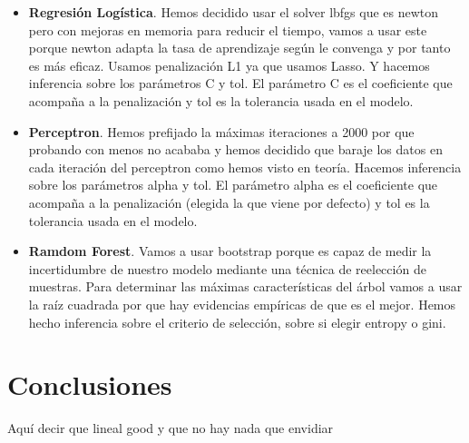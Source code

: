 \documentclass[a4paper,11pt]{article}
\begin{document}
\begin{itemize}

\item \textbf{Regresión Logística}. Hemos decidido usar el solver lbfgs que es newton pero con mejoras en memoria para reducir el tiempo, vamos a usar este porque newton adapta la tasa de aprendizaje según le convenga y por tanto es más eficaz. Usamos penalización L1 ya que usamos Lasso. Y hacemos inferencia sobre los parámetros C y tol. El parámetro C es el coeficiente que acompaña a la penalización y tol es la tolerancia usada en el modelo.

\item \textbf{Perceptron}. Hemos prefijado la máximas iteraciones a 2000 por que probando con menos no acababa y hemos decidido que baraje los datos en cada iteración del perceptron como hemos visto en teoría. Hacemos inferencia sobre los parámetros alpha y tol. El parámetro alpha es el coeficiente que acompaña a la penalización (elegida la que viene por defecto) y tol es la tolerancia usada en el modelo.

\item \textbf{Ramdom Forest}. Vamos a usar bootstrap porque es capaz de medir la incertidumbre de nuestro modelo mediante una técnica de reelección de muestras. Para determinar las máximas características del árbol vamos a usar la raíz cuadrada por que hay evidencias empíricas de que es el mejor. Hemos hecho inferencia sobre el criterio de selección, sobre si elegir entropy o gini. 

\end{itemize}

\section{Conclusiones}

Aquí decir que lineal good y que no hay nada que envidiar
\end{document}
